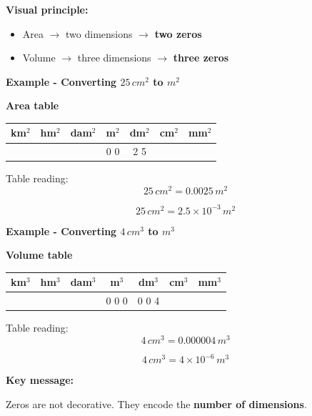 \documentclass[11pt,a4paper]{article}
\newcommand{\theorybox}[2]{
\begin{tcolorbox}[title=\textbf{#1}]
#2
\end{tcolorbox}
}
\begin{document}
\theorybox{E - Area and volume conversions (dimensional table)}{

\textbf{Visual principle:}

\begin{itemize}
\item Area $\rightarrow$ two dimensions $\rightarrow$ \textbf{two zeros}
\item Volume $\rightarrow$ three dimensions $\rightarrow$ \textbf{three zeros}
\end{itemize}

\vspace{0.2cm}

\textbf{Example - Converting $25\,\si{cm^2}$ to $\si{m^2}$}

\begin{center}
\textbf{Area table}
\begin{tabular}{c|c|c|c|c|c|c}
km$^2$ & hm$^2$ & dam$^2$ & m$^2$ & dm$^2$ & cm$^2$ & mm$^2$ \\
\hline
       &        &         & 0 0 & 2 5 &       &        \\
\end{tabular}
\end{center}

Table reading:
\[
25\,\si{cm^2} = 0.0025\,\si{m^2}
\]

\[
25\,\si{cm^2} = 2.5 \times 10^{-3}\,\si{m^2}
\]

\vspace{0.4cm}

\textbf{Example - Converting $4\,\si{cm^3}$ to $\si{m^3}$}

\begin{center}
\textbf{Volume table}
\begin{tabular}{c|c|c|c|c|c|c}
km$^3$ & hm$^3$ & dam$^3$ & m$^3$ & dm$^3$ & cm$^3$ & mm$^3$ \\
\hline
       &        &         & 0 0 0 & 0 0 4 &        &        \\
\end{tabular}
\end{center}

Table reading:
\[
4\,\si{cm^3} = 0.000004\,\si{m^3}
\]

\[
4\,\si{cm^3} = 4 \times 10^{-6}\,\si{m^3}
\]

\vspace{0.2cm}

\textbf{Key message:}

Zeros are not decorative.  
They encode the \textbf{number of dimensions}.
}
\end{document}
